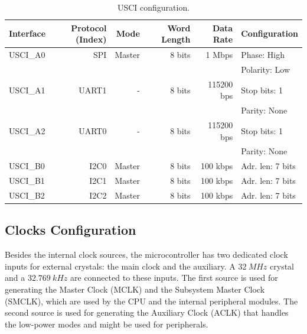 \begin{table}[!ht]
    \centering
    \begin{tabular}{lrrrrl}
        \toprule[1.5pt]
        \textbf{Interface} & \textbf{Protocol (Index)} & \textbf{Mode} & \textbf{Word Length} & \textbf{Data Rate} & \textbf{Configuration} \\
        \midrule
        USCI\_A0           & SPI                       & Master        & 8 bits               & 1 Mbps             & Phase: High \\
                           &                           &               &                      &                    & Polarity: Low \\
        USCI\_A1           & UART1                     & -             & 8 bits               & 115200 bps         & Stop bits: 1 \\
                           &                           &               &                      &                    & Parity: None \\
        USCI\_A2           & UART0                     & -             & 8 bits               & 115200 bps         & Stop bits: 1 \\
                           &                           &               &                      &                    & Parity: None \\
        USCI\_B0           & I2C0                      & Master        & 8 bits               & 100 kbps           & Adr. len: 7 bits \\
        USCI\_B1           & I2C1                      & Master        & 8 bits               & 100 kbps           & Adr. len: 7 bits \\
        USCI\_B2           & I2C2                      & Master        & 8 bits               & 100 kbps           & Adr. len: 7 bits \\
        \bottomrule[1.5pt]
    \end{tabular}
    \caption{USCI configuration.}
    \label{tab:usci-config}
\end{table}

\subsection{Clocks Configuration}

Besides the internal clock sources, the microcontroller has two dedicated clock inputs for external crystals: the main clock and the auxiliary. A $32\ MHz$ crystal and a $32.769\ kHz$ are connected to these inputs. The first source is used for generating the Master Clock (MCLK) and the Subsystem Master Clock (SMCLK), which are used by the CPU and the internal peripheral modules. The second source is used for generating the Auxiliary Clock (ACLK) that handles the low-power modes and might be used for peripherals.

